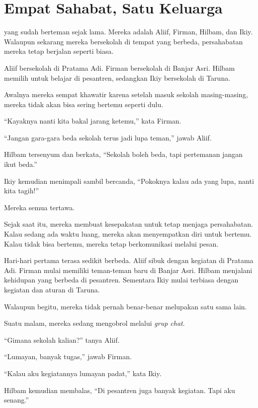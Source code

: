 \chapter*{Empat Sahabat, Satu Keluarga}


 yang sudah berteman sejak lama. Mereka adalah Aliif, Firman, Hilbam, dan Ikiy. Walaupun sekarang mereka bersekolah di tempat yang berbeda, persahabatan mereka tetap berjalan seperti biasa.

Aliif bersekolah di Pratama Adi. Firman bersekolah di Banjar Asri. Hilbam memilih untuk belajar di pesantren, sedangkan Ikiy bersekolah di Taruna.

Awalnya mereka sempat khawatir karena setelah masuk sekolah masing-masing, mereka tidak akan bisa sering bertemu seperti dulu.

``Kayaknya nanti kita bakal jarang ketemu,'' kata Firman.

``Jangan gara-gara beda sekolah terus jadi lupa teman,'' jawab Aliif.

Hilbam tersenyum dan berkata, ``Sekolah boleh beda, tapi pertemanan jangan ikut beda.''

Ikiy kemudian menimpali sambil bercanda, ``Pokoknya kalau ada yang lupa, nanti kita tagih!''

Mereka semua tertawa.

Sejak saat itu, mereka membuat kesepakatan untuk tetap menjaga persahabatan. Kalau sedang ada waktu luang, mereka akan menyempatkan diri untuk bertemu. Kalau tidak bisa bertemu, mereka tetap berkomunikasi melalui pesan.

Hari-hari pertama terasa sedikit berbeda. Aliif sibuk dengan kegiatan di Pratama Adi. Firman mulai memiliki teman-teman baru di Banjar Asri. Hilbam menjalani kehidupan yang berbeda di pesantren. Sementara Ikiy mulai terbiasa dengan kegiatan dan aturan di Taruna.

Walaupun begitu, mereka tidak pernah benar-benar melupakan satu sama lain.

Suatu malam, mereka sedang mengobrol melalui \textit{grup chat}.

``Gimana sekolah kalian?'' tanya Aliif.

``Lumayan, banyak tugas,'' jawab Firman.

``Kalau aku kegiatannya lumayan padat,'' kata Ikiy.

Hilbam kemudian membalas, ``Di pesantren juga banyak kegiatan. Tapi aku senang.''

